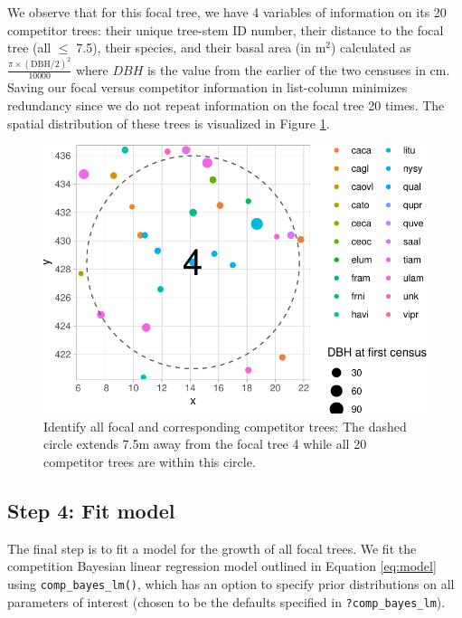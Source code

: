 \documentclass[12pt]{article}
\newenvironment{Shaded}{\begin{snugshade}}{\end{snugshade}}
\newcommand{\DataTypeTok}[1]{\textcolor[rgb]{0.13,0.29,0.53}{#1}}
\newcommand{\KeywordTok}[1]{\textcolor[rgb]{0.13,0.29,0.53}{\textbf{#1}}}
\newcommand{\NormalTok}[1]{#1}
\newcommand{\OperatorTok}[1]{\textcolor[rgb]{0.81,0.36,0.00}{\textbf{#1}}}
\newcommand{\OtherTok}[1]{\textcolor[rgb]{0.56,0.35,0.01}{#1}}
\newcommand{\StringTok}[1]{\textcolor[rgb]{0.31,0.60,0.02}{#1}}
\begin{document}
We observe that for this focal tree, we have 4 variables of information
on its 20 competitor trees: their unique tree-stem ID number, their
distance to the focal tree (all \(\leq\) 7.5), their species, and their
basal area (in m\(^2\)) calculated as
\(\frac{\pi \times (\text{DBH/2})^2}{10000}\) where \(DBH\) is the value
from the earlier of the two censuses in cm. Saving our focal versus
competitor information in list-column minimizes redundancy since we do
not repeat information on the focal tree 20 times. The spatial
distribution of these trees is visualized in Figure
\ref{fig:scbi-focal-vs-comp-map}.

\begin{figure}

{\centering \includegraphics[width=0.66\linewidth]{Figures/scbi-focal-vs-comp-map-1} 

}

\caption{Identify all focal and corresponding competitor trees: The dashed circle extends 7.5m away from the focal tree 4 while all 20 competitor trees are within this circle.}\label{fig:scbi-focal-vs-comp-map}
\end{figure}

\hypertarget{model-fit-predict}{%
\subsection{Step 4: Fit model}\label{model-fit-predict}}

The final step is to fit a model for the growth of all focal trees. We
fit the competition Bayesian linear regression model outlined in
Equation \ref{eq:model} using \texttt{comp\_bayes\_lm()}, which has an
option to specify prior distributions on all parameters of interest
(chosen to be the defaults specified in \texttt{?comp\_bayes\_lm}).

\begin{Shaded}
\end{Shaded}
\end{document}
